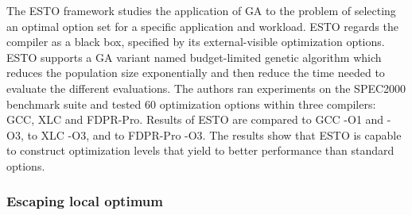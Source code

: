 The ESTO framework\cite{bashkansky2007black} studies the application of GA to the problem of selecting an optimal option set for a specific application and workload. ESTO regards the compiler as a black box, specified by its external-visible optimization options. ESTO supports a GA variant named budget-limited genetic algorithm which reduces the population size exponentially and then reduce the time needed to evaluate the different evaluations. The authors ran experiments on the SPEC2000 benchmark suite and tested 60 optimization options within three compilers: GCC, XLC and FDPR-Pro. Results of ESTO are compared to GCC -O1 and -O3, to XLC -O3, and to FDPR-Pro -O3. The results show that ESTO is capable to construct optimization levels that yield to better performance than standard options.



\subsubsection{Escaping local optimum}


